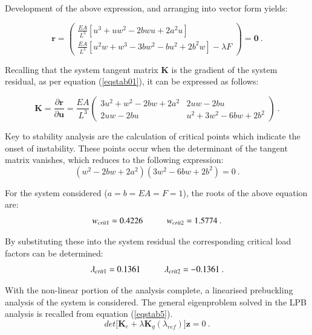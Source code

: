 Development of the above expression, and arranging into vector form yields:

\begin{equation} 
\mathbf{r} = 
\begin{pmatrix}
\frac{EA}{L^3} [u^3+uw^2-2bwu+2a^2u] \\
\frac{EA}{L^3} [u^2w + w^3 - 3bw^2 - bu^2 +2b^2w] - \lambda F
\end{pmatrix}
=
\mathbf{0}
\label{eqapp0_6_1}\ .
\end{equation}

Recalling that the system tangent matrix $\mathbf{K}$ is the gradient of the system residual, as per equation (\ref{eqstab01}), it can be expressed as follows:

\begin{equation} 
\mathbf{K} = 
\frac{\partial \mathbf{r}}{\partial \mathbf{u}}
=
\frac{EA}{L^3}
\begin{pmatrix}
3u^2 + w^2 - 2bw +2a^2 & 2uw -2bu \\
2uw - 2bu & u^2 + 3w^2 - 6bw + 2b^2
\end{pmatrix}
\label{eqapp0_7}\ .
\end{equation}

Key to stability analysis are the calculation of critical points which indicate the onset of instability. These points occur when the determinant of the tangent matrix vanishes, which reduces to the following expression:
\begin{equation} 
(w^2 - 2bw +2a^2)
(3w^2 -6bw +2b^2) = 0
\label{eqapp0_8}\ .
\end{equation}

For the system considered ($a=b=EA=F=1$), the roots of the above equation are:
\begin{equation} 
w_{crit1} = 0.4226
\hspace{10mm}
w_{crit2} = 1.5774
\label{eqapp0_9}\ .
\end{equation}

By substituting these into the system residual the corresponding critical load factors can be determined:
\begin{equation} 
\lambda_{crit1} = 0.1361
\hspace{10mm}
\lambda_{crit2} = -0.1361
\label{eqapp0_10}\ .
\end{equation}

With the non-linear portion of the analysis complete, a linearised prebuckling analysis of the system is considered. The general eigenproblem solved in the LPB analysis is recalled from equation (\ref{eqstab5}).
 \begin{equation} 
det\big[
\mathbf{K}_e +
{\lambda}
\mathbf{K}_g(\lambda_{ref})
\big]\mathbf{z} = 0
\label{eqapp0_11}\ .
\end{equation}

